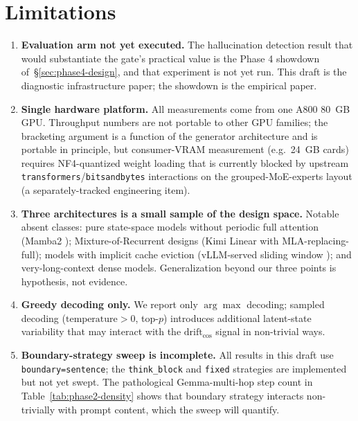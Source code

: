 \documentclass[11pt,letterpaper]{article}
\newcommand{\drift}{\mathrm{drift}_{\cos}}
\begin{document}
\section{Limitations}
\label{sec:limitations}

\begin{enumerate}[leftmargin=*, itemsep=2pt]
\item \textbf{Evaluation arm not yet executed.} The hallucination
detection result that would substantiate the gate's practical value is
the Phase 4 showdown of~\S\ref{sec:phase4-design}, and
that experiment is not yet run. This draft is the diagnostic
infrastructure paper; the showdown is the empirical paper.
\item \textbf{Single hardware platform.} All measurements come from one
A800 80~GB GPU. Throughput numbers are not portable to other GPU
families; the bracketing argument is a function of the generator
architecture and is portable in principle, but consumer-VRAM
measurement (e.g.~24~GB cards) requires NF4-quantized weight loading
that is currently blocked by upstream
\texttt{transformers}/\texttt{bitsandbytes} interactions on the
grouped-MoE-experts layout (a separately-tracked engineering item).
\item \textbf{Three architectures is a small sample of the design space.}
Notable absent classes: pure state-space models without periodic full
attention (Mamba2 \citep{TODO:mamba2}); Mixture-of-Recurrent designs
(Kimi Linear \citep{TODO:kimi-linear} with MLA-replacing-full); models
with implicit cache eviction (vLLM-served sliding window
\citep{TODO:vllm}); and very-long-context dense models. Generalization
beyond our three points is hypothesis, not evidence.
\item \textbf{Greedy decoding only.} We report only $\arg\max$ decoding;
sampled decoding ($\mathrm{temperature} > 0$, top-$p$) introduces
additional latent-state variability that may interact with the
$\drift$ signal in non-trivial ways.
\item \textbf{Boundary-strategy sweep is incomplete.} All results in
this draft use \texttt{boundary=sentence}; the
\texttt{think\_block} and \texttt{fixed} strategies are implemented but
not yet swept. The pathological Gemma-multi-hop step count in
Table~\ref{tab:phase2-density} shows that boundary strategy interacts
non-trivially with prompt content, which the sweep will quantify.
\end{enumerate}
\end{document}
